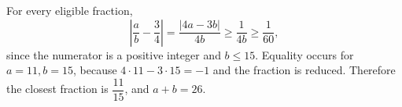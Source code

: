 For every eligible fraction,
\[
\left|\dfrac{a}{b}-\dfrac{3}{4}\right|=\dfrac{|4a-3b|}{4b}\ge\dfrac{1}{4b}\ge\dfrac{1}{60},
\]
since the numerator is a positive integer and $b\le15$. Equality occurs for $a=11,b=15$, because $4\cdot11-3\cdot15=-1$ and the fraction is reduced. Therefore the closest fraction is $\dfrac{11}{15}$, and $\boxed{a+b=26}$.
